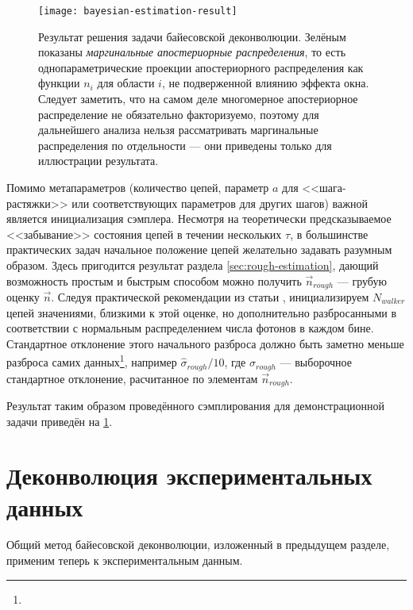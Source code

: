 \begin{figure}
	\centering
	\texttt{[image: bayesian-estimation-result]}
	\caption{Результат решения задачи байесовской деконволюции. Зелёным показаны \textit{маргинальные апостериорные распределения}, то есть однопараметрические проекции апостериорного распределения как функции $n_i$ для области $i$, не подверженной влиянию эффекта окна. Следует заметить, что на самом деле многомерное апостериорное распределение не обязательно факторизуемо, поэтому для дальнейшего анализа нельзя рассматривать маргинальные распределения по отдельности --- они приведены только для иллюстрации результата.}
	\label{pic:bayesian-estimation}
\end{figure}

Помимо метапараметров (количество цепей, параметр $a$ для <<шага-растяжки>> или соответствующих параметров для других шагов) важной является инициализация сэмплера. Несмотря на теоретически предсказываемое <<забывание>> состояния цепей в течении нескольких $\tau$, в большинстве практических задач начальное положение цепей желательно задавать разумным образом. Здесь пригодится результат раздела \ref{sec:rough-estimation}, дающий возможность простым и быстрым способом можно получить $\vec{n}_{rough}$ --- грубую оценку $\vec{n}$. Следуя практической рекомендации из статьи \cite{ForemanMackey2016}, инициализируем $N_{walker}$ цепей значениями, близкими к этой оценке, но дополнительно разбросанными в соответствии с нормальным распределением числа фотонов в каждом бине. Стандартное отклонение этого начального разброса должно быть заметно меньше разброса самих данных\footnote{}, например $\hat{\sigma}_{rough} / 10$, где $\hat{\sigma}_{rough}$ --- выборочное стандартное отклонение, расчитанное по элементам $\vec{n}_{rough}$.

Результат таким образом проведённого сэмплирования для демонстрационной задачи приведён на \ref{pic:bayesian-estimation}.


\section{Деконволюция экспериментальных данных}

Общий метод байесовской деконволюции, изложенный в предыдущем разделе, применим теперь к экспериментальным данным.

